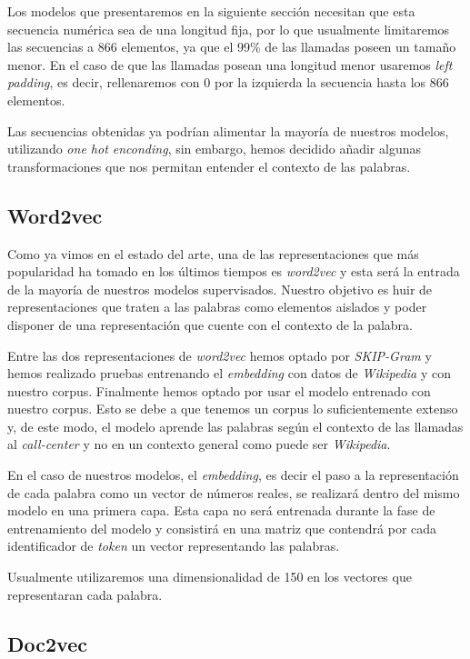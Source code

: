 Los modelos que presentaremos en la siguiente sección necesitan que esta secuencia numérica sea de una longitud fija, por lo que usualmente limitaremos las secuencias a 866 elementos, ya que el 99\% de las llamadas poseen un tamaño menor. En el caso de  que las llamadas posean una longitud menor usaremos \textit{left padding}, es decir, rellenaremos con 0 por la izquierda la secuencia hasta los 866 elementos.


Las secuencias obtenidas ya podrían alimentar la mayoría de nuestros modelos, utilizando \textit{one hot enconding}, sin embargo, hemos decidido añadir algunas transformaciones que nos permitan entender el contexto de las palabras.  

\subsection{Word2vec}
Como ya vimos en el estado del arte, una de las representaciones que más popularidad ha tomado  en los últimos tiempos es \textit{word2vec} y esta será la entrada de la mayoría de nuestros modelos supervisados. Nuestro objetivo es huir de representaciones que traten a las palabras como elementos aislados y poder disponer de una representación que cuente con el contexto de la palabra.

Entre las dos representaciones de \textit{word2vec} hemos optado por \textit{SKIP-Gram} y hemos realizado pruebas entrenando el \textit{embedding} con datos de \textit{Wikipedia} y con nuestro corpus. Finalmente hemos optado por usar el modelo entrenado con nuestro corpus. Esto se debe a que tenemos un corpus lo suficientemente extenso y, de este modo, el modelo aprende las palabras según el contexto de las llamadas al \textit{call-center} y no en un contexto general como puede ser \textit{Wikipedia}.

En el caso de nuestros modelos, el \textit{embedding}, es decir el paso a la representación de cada palabra como un vector de números reales, se realizará dentro del mismo modelo en una primera capa. Esta capa no será entrenada durante la fase de entrenamiento del modelo y consistirá en una matriz que contendrá por cada identificador de \textit{token} un vector representando las palabras. 


Usualmente utilizaremos una dimensionalidad de 150 en los vectores que representaran cada palabra.

\subsection{Doc2vec}

